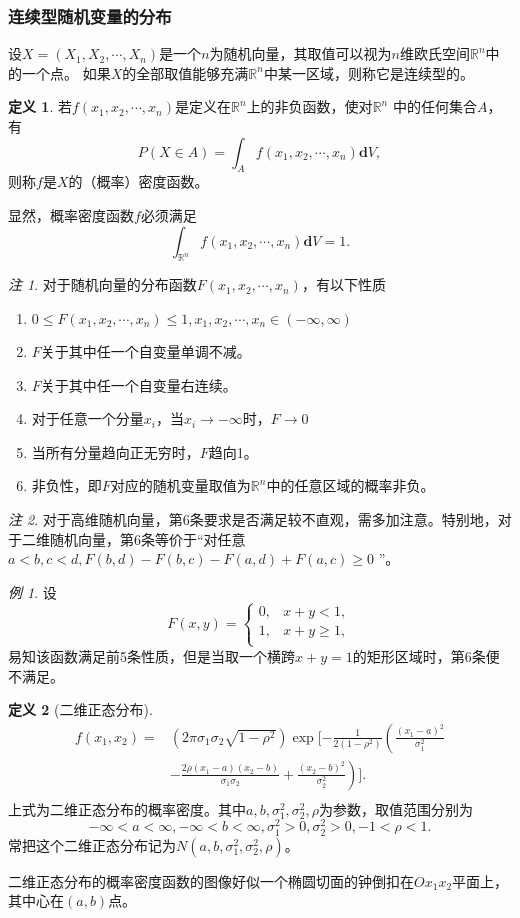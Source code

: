 \documentclass[a4paper,11pt]{article}%
\theoremstyle{remark}
\newtheorem*{remark}{注}
\theoremstyle{remark}
\newtheorem*{example}{例}
\theoremstyle{definition}
\theoremstyle{definition}
\newtheorem*{definition}{定义}
\theoremstyle{plain}
\begin{document}
\subsubsection{连续型随机变量的分布}
设$X=(X_1,X_2,\cdots,X_n)$是一个$n$为随机向量，其取值可以视为$n$维欧氏空间$\mathbb{R}^n$中的一个点。
如果$X$的全部取值能够充满$\mathbb{R}^n$中某一区域，则称它是连续型的。
\begin{definition}
    若$f(x_1,x_2,\cdots,x_n)$是定义在$\mathbb{R}^n$上的非负函数，使对$\mathbb{R}^n$
    中的任何集合$A$，有
    \[P(X\in A)=\int_Af(x_1,x_2,\cdots,x_n)\mathbf{d}V,\]
    则称$f$是$X$的（概率）密度函数。
\end{definition}
显然，概率密度函数$f$必须满足 
\[\int_{\mathbb{R}^n}f(x_1,x_2,\cdots,x_n)\mathbf{d}V=1.\]
\begin{remark}
    对于随机向量的分布函数$F(x_1,x_2,\cdots,x_n)$，有以下性质
    \begin{enumerate}
        \item$0\leq F(x_1,x_2,\cdots,x_n)\leq 1,x_1,x_2,\cdots,x_n\in (-\infty,\infty)$
        \item$F$关于其中任一个自变量单调不减。
        \item$F$关于其中任一个自变量右连续。
        \item 对于任意一个分量$x_i$，当$x_i\rightarrow -\infty$时，$F\rightarrow 0$
        \item 当所有分量趋向正无穷时，$F$趋向1。
        \item 非负性，即$F$对应的随机变量取值为$\mathbb{R}^n$中的任意区域的概率非负。
    \end{enumerate}
\end{remark}
\begin{remark}
    对于高维随机向量，第6条要求是否满足较不直观，需多加注意。特别地，对于二维随机向量，第6条等价于“对任意$a<b,c<d,F(b,d)-F(b,c)-F(a,d)+F(a,c)\geq 0$ ”。
\end{remark}
\begin{example}
    设 
    \[F(x,y)=\begin{cases}
        0,&x+y<1,\\
        1,&x+y\geq 1,\\
    \end{cases}\]
    易知该函数满足前5条性质，但是当取一个横跨$x+y=1$的矩形区域时，第6条便不满足。
\end{example}
\begin{definition}[二维正态分布]
    \[
    \begin{array}{rl}
   f(x_1,x_2)=&(2\pi\sigma_1\sigma_2\sqrt{1-\rho^2})\exp[-\frac{1}{2(1-\rho^2)}\left(\frac{(x_1-a)^2}{\sigma_1^2} \right. \\
              &\left. -\frac{2\rho(x_1-a)(x_2-b)}{\sigma_1\sigma_2}+\frac{(x_2-b)^2}{\sigma_2^2}\right)].\\
    \end{array}
    \]
    上式为二维正态分布的概率密度。其中$a,b,\sigma^2_1,\sigma^2_2,\rho$为参数，取值范围分别为
    \[-\infty<a<\infty,-\infty<b<\infty,\sigma_1^2>0,\sigma_2^2>0,-1<\rho<1.\]
    常把这个二维正态分布记为$N(a,b,\sigma_1^2,\sigma_2^2,\rho)$。

    二维正态分布的概率密度函数的图像好似一个椭圆切面的钟倒扣在$Ox_1x_2$平面上，其中心在$(a,b)$点。 
\end{definition}
\end{document}

